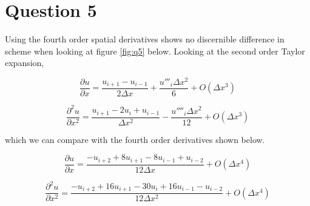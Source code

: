 \documentclass[10pt, a4paper]{article}
\begin{document}
\section*{Question 5}
\noindent
\newline

Using the fourth order spatial derivatives shows no discernible difference in scheme when looking at figure \ref{fig:q5} below. Looking at the second order Taylor expansion,

\begin{equation}
\frac{\partial u}{\partial x}
   = \frac{u_{i+1} - u_{i-1}}{2 \Delta x} + \frac{u'''_{i} \Delta x^2}{6} + O(\Delta x^3)
\end{equation}  

\begin{equation}
\frac{\partial^2 u}{\partial x^2}
   = \frac{u_{i+1} - 2u_i + u_{i-1}}{\Delta x^2} - \frac{u''''_{i} \Delta x^2}{12} + O(\Delta x^3)
\end{equation}

which we can compare with the fourth order derivatives shown below.

\begin{equation}
\frac{\partial u}{\partial x}
   = \frac{-u_{i+2} + 8u_{i+1} - 8u_{i-1} + u_{i-2}}{12 \Delta x} + O(\Delta x^4)
\end{equation}

\begin{equation}
\frac{\partial^2 u}{\partial x^2}
   = \frac{-u_{i+2} + 16u_{i+1} - 30u_i + 16u_{i-1} -u_{i-2}}{12 \Delta x^2} + O(\Delta x^4)
\end{equation}
\end{document}
